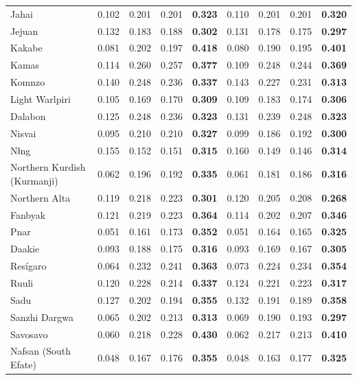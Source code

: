 \begin{longtable}{lcccccccc}
Jahai & 0.102 & 0.201 & 0.201 & \textbf{0.323} & 0.110 & 0.201 & 0.201 & \textbf{0.320} \\
Jejuan & 0.132 & 0.183 & 0.188 & \textbf{0.302} & 0.131 & 0.178 & 0.175 & \textbf{0.297} \\
Kakabe & 0.081 & 0.202 & 0.197 & \textbf{0.418} & 0.080 & 0.190 & 0.195 & \textbf{0.401} \\
Kamas & 0.114 & 0.260 & 0.257 & \textbf{0.377} & 0.109 & 0.248 & 0.244 & \textbf{0.369} \\
Komnzo & 0.140 & 0.248 & 0.236 & \textbf{0.337} & 0.143 & 0.227 & 0.231 & \textbf{0.313} \\
Light Warlpiri & 0.105 & 0.169 & 0.170 & \textbf{0.309} & 0.109 & 0.183 & 0.174 & \textbf{0.306} \\
Dalabon & 0.125 & 0.248 & 0.236 & \textbf{0.323} & 0.131 & 0.239 & 0.248 & \textbf{0.323} \\
Nisvai & 0.095 & 0.210 & 0.210 & \textbf{0.327} & 0.099 & 0.186 & 0.192 & \textbf{0.300} \\
Nǁng & 0.155 & 0.152 & 0.151 & \textbf{0.315} & 0.160 & 0.149 & 0.146 & \textbf{0.314} \\
Northern Kurdish (Kurmanji) & 0.062 & 0.196 & 0.192 & \textbf{0.335} & 0.061 & 0.181 & 0.186 & \textbf{0.316} \\
Northern Alta & 0.119 & 0.218 & 0.223 & \textbf{0.301} & 0.120 & 0.205 & 0.208 & \textbf{0.268} \\
Fanbyak & 0.121 & 0.219 & 0.223 & \textbf{0.364} & 0.114 & 0.202 & 0.207 & \textbf{0.346} \\
Pnar & 0.051 & 0.161 & 0.173 & \textbf{0.352} & 0.051 & 0.164 & 0.165 & \textbf{0.325} \\
Daakie & 0.093 & 0.188 & 0.175 & \textbf{0.316} & 0.093 & 0.169 & 0.167 & \textbf{0.305} \\
Resígaro & 0.064 & 0.232 & 0.241 & \textbf{0.363} & 0.073 & 0.224 & 0.234 & \textbf{0.354} \\
Ruuli & 0.120 & 0.228 & 0.214 & \textbf{0.337} & 0.124 & 0.221 & 0.223 & \textbf{0.317} \\
Sadu & 0.127 & 0.202 & 0.194 & \textbf{0.355} & 0.132 & 0.191 & 0.189 & \textbf{0.358} \\
Sanzhi Dargwa & 0.065 & 0.202 & 0.213 & \textbf{0.313} & 0.069 & 0.190 & 0.193 & \textbf{0.297} \\
Savosavo & 0.060 & 0.218 & 0.228 & \textbf{0.430} & 0.062 & 0.217 & 0.213 & \textbf{0.410} \\
Nafsan (South Efate) & 0.048 & 0.167 & 0.176 & \textbf{0.355} & 0.048 & 0.163 & 0.177 & \textbf{0.325} \\

\end{longtable}
